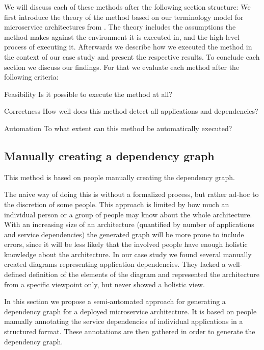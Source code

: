 We will discuss each of these methods after the following section structure: We first introduce the theory of the method based on our terminology model for microservice architectures from . The theory includes the assumptions the method makes against the environment it is executed in, and the high-level process of executing it. Afterwards we describe how we executed the method in the context of our case study and present the respective results. To conclude each section we discuss our findings. For that we evaluate each method after the following criteria:
\begin{tdescription}
  \item[Feasibility] Is it possible to execute the method at all?
  \item[Correctness] How well does this method detect all applications and dependencies?
  \item[Automation] To what extent can this method be automatically executed?
\end{tdescription}

\subsection{Manually creating a dependency graph}
\label{subsec:graph_manual_annotation}

This method is based on people manually creating the dependency graph.

The naive way of doing this is without a formalized process, but rather ad-hoc to the discretion of some people. This approach is limited by how much an individual person or a group of people may know about the whole architecture. With an increasing size of an architecture (quantified by number of applications and service dependencies) the generated graph will be more prone to include errors, since it will be less likely that the involved people have enough holistic knowledge about the architecture. In our case study we found several manually created diagrams representing application dependencies. They lacked a well-defined definition of the elements of the diagram and represented the architecture from a specific viewpoint only, but never showed a holistic view.

In this section we propose a semi-automated approach for generating a dependency graph for a deployed microservice architecture. It is based on people manually annotating the service dependencies of individual applications in a structured format. These annotations are then gathered in order to generate the dependency graph.

